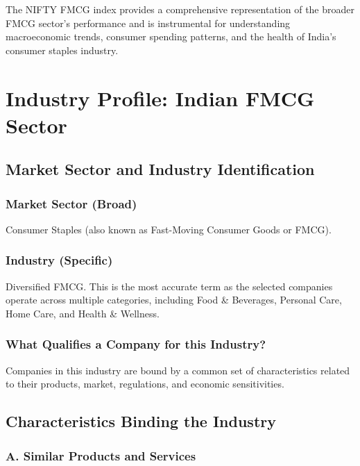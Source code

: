 \documentclass[12pt, a4paper]{report}
\begin{document}
The NIFTY FMCG index provides a comprehensive representation of the broader FMCG sector's performance and is instrumental for understanding macroeconomic trends, consumer spending patterns, and the health of India's consumer staples industry.

\newpage

\chapter{Industry Profile: Indian FMCG Sector}

\section{Market Sector and Industry Identification}

\subsection{Market Sector (Broad)}
Consumer Staples (also known as Fast-Moving Consumer Goods or FMCG).

\subsection{Industry (Specific)}
Diversified FMCG. This is the most accurate term as the selected companies operate across multiple categories, including Food \& Beverages, Personal Care, Home Care, and Health \& Wellness.

\subsection{What Qualifies a Company for this Industry?}

Companies in this industry are bound by a common set of characteristics related to their products, market, regulations, and economic sensitivities.

\section{Characteristics Binding the Industry}

\subsection{A. Similar Products and Services}
\end{document}
